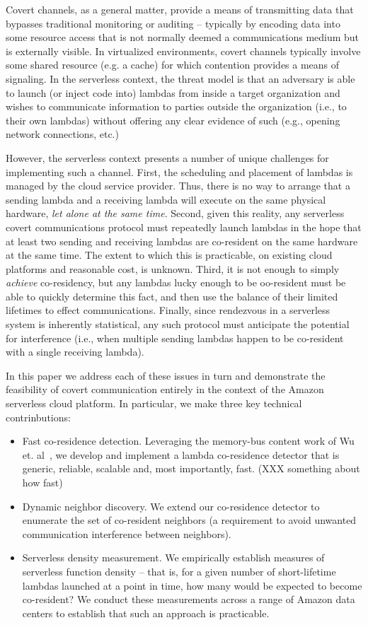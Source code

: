 Covert channels, as a general matter, provide a means of transmitting
data that bypasses traditional monitoring or auditing -- typically by
encoding data into some resource access that is not normally deemed a
communications medium but is externally visible.  In virtualized
environments, covert channels typically involve some shared resource
(e.g. a cache) for which contention provides a means of signaling.
In the serverless context, the threat model is that an adversary is
able to launch (or inject code into) lambdas from inside a target
organization and wishes to communicate information to parties outside
the organization (i.e., to their own lambdas) without offering any
clear evidence of such (e.g., opening network connections, etc.)

However, the serverless context presents a number of unique challenges
for implementing such a channel.  First, the scheduling and placement
of lambdas is managed by the cloud service provider.  Thus, there is
no way to arrange that a sending lambda and a receiving lambda will
execute on the same physical hardware, \emph{let alone at the same
  time}.  Second, given this reality, any serverless covert
communications protocol must repeatedly launch lambdas in the hope
that at least two sending and receiving lambdas are co-resident on the
same hardware at the same time.  The extent to which this is
practicable, on existing cloud platforms and reasonable cost, is
unknown.  Third, it is not enough to simply \emph{achieve}
co-residency, but any lambdas lucky enough to be oo-resident must be
able to quickly determine this fact, and then use the balance of their
limited lifetimes to effect communications.  Finally, since rendezvous
in a serverless system is inherently statistical, any such protocol
must anticipate the potential for interference (i.e., when multiple
sending lambdas happen to be co-resident with a single receiving
lambda).

In this paper we address each of these issues in turn and demonstrate
the feasibility of covert communication entirely in the context of the
Amazon serverless cloud platform.  In particular, we make three key technical
contrinbutions:
\begin{itemize}
\item{Fast co-residence detection.}  Leveraging the memory-bus content
  work of Wu et.  al~\cite{wuusenix2012}, we develop and implement a
  lambda co-residence detector that is generic, reliable, scalable
  and, most importantly, fast.  (XXX something about how fast)
\item{Dynamic neighbor discovery.}  We extend our co-residence
  detector to enumerate the set of co-resident neighbors (a
  requirement to avoid unwanted communication interference between
  neighbors).
\item{Serverless density measurement}.  We empirically establish
  measures of serverless function density -- that is, for a given
  number of short-lifetime lambdas launched at a point in time, how
  many would be expected to become co-resident?  We conduct these
  measurements across a range of Amazon data centers to establish that
  such an approach is practicable.
\end{itemize}

